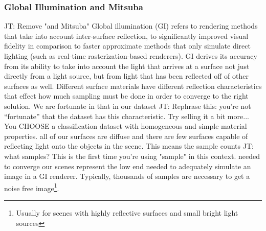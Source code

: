 \documentclass[10pt,twocolumn,letterpaper]{article}
\newcommand{\tompson}[1]{{\color{green} JT: #1}}
\begin{document}

\subsubsection{Global Illumination and Mitsuba}\label{mitsuba_section}

\tompson{Remove "and Mitsuba"}
Global illumination (GI) refers to rendering methods that take into account inter-surface reflection, to significantly improved visual fidelity in comparison to faster approximate methods that only simulate direct lighting (such as real-time rasterization-based renderers).  GI derives its accuracy from its ability to take into account the light that arrives at a surface not just directly from a light source, but from light that has been reflected off of other surfaces as well. Different surface materials have different reflection characteristics that effect how much sampling must be done in order to converge to the right solution.  We are fortunate in that in our dataset \tompson{Rephrase this: you're not ``fortunate'' that the dataset has this characteristic. Try selling it a bit more...  You CHOOSE a classification dataset with homogeneous and simple material properties.} all of our surfaces are diffuse and there are few surfaces capable of reflecting light onto the objects in the scene.  This means the sample counts \tompson{what samples? This is the first time you're using "sample" in this context.} needed to converge our scenes represent the low end needed to adequately simulate an image in a GI renderer. Typically, thousands of samples are necessary to get a noise free image\footnote{Usually for scenes with highly reflective surfaces and small bright light sources}.\\
\end{document}

